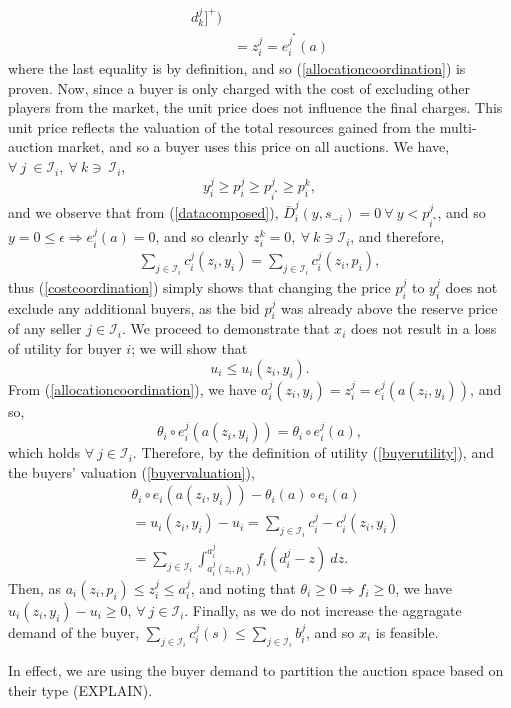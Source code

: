 \documentclass[12pt]{article}
\theoremstyle{definition}
\newcommand{\mcI}{\mathcal{I}}
\begin{document}
\begin{multicols}{2}
\begin{align*}
d_k^{j}\bigg\rbrack^+\bigg) \\
    &= z_i^{j}= e_i^{j^*}(a)
\end{align*}
where the last equality is by definition, and so (\ref{allocationcoordination}) is proven.
Now, since a buyer is only charged with the cost of excluding other players from the market, the
unit price does not influence the final charges. This unit price reflects the
valuation of the total resources gained from the multi-auction market, and so a buyer uses this price on all
auctions.
We have, $\forall \ j\  \in \mcI_i, \ \forall \ k \ni \ \mcI_i$,
$$
    y_i^j \ge p_i^j \ge p_{i^*}^j\ge p_i^k,
$$
and we observe that from (\ref{datacomposed}), $\bar{D}_i^j(y, s_{-i}) =
0 \ \forall \ y < p_{i^*}^j$, and so $y=0 \le \epsilon \Rightarrow e_i^j(a) = 0$,
and so clearly $z_i^k = 0, \ \forall \ k \ni \mcI_i$, and therefore,
\begin{align*}
    \displaystyle\sum_{j\in\mcI_i} c_i^j(z_i,y_i) =\sum_{j\in\mcI_i}
c_i^j(z_i,p_i),
\end{align*}
thus (\ref{costcoordination}) simply shows that changing the price $p^j_i$ to $y^j_i$ does not exclude any
additional buyers, as the bid $p^j_i$ was already above the reserve price of any
seller $j \in \mcI_i$.
We proceed to demonstrate that $x_i$ does not result in a loss of utility for
buyer $i$; we will show that
$$
    u_i \le u_i(z_i,y_i).
$$
From (\ref{allocationcoordination}), we have $a_i^{j}(z_i,y_i) = z_i^{j} = e_i^j(a(z_i,y_i))$, 
and so,
$$
    \theta_i\circ e_i^j(a(z_i,y_i)) = \theta_i\circ e_i^j(a),
$$ 
which holds $\forall \ j\in\mcI_i$.
Therefore, by the definition of utility (\ref{buyerutility}),
and the buyers' valuation (\ref{buyervaluation}), 
\begin{align*}
    &\theta_i\circ e_i(a(z_i,y_i)) - \theta_i(a)\circ e_i(a) \\
    &= u_i(z_i,y_i) - u_i =  \displaystyle\sum_{j\in\mcI_i} c_i^j -c_i^{j}(z_i,y_i)\\
    &= \sum_{j\in\mcI_i}\int_{a_i^j(z_i,p_i)}^{a_i^j} f_i(d_i^j - z) \ dz.
\end{align*}
Then, as $a_i(z_i,p_i) \le z_i^j \le a_i^j $, and noting that
$\theta_i\ge 0\Rightarrow f_i\ge 0$, we have $u_i(z_i,y_i) - u_i \ge 0$, $\forall \ j\in\mcI_i$.
Finally, as we do
not increase the aggragate demand of the buyer, $\sum_{j\in\mcI_i} c_i^j(s) \le 
\sum_{j\in\mcI_i} b_i^j$, and so $x_i$ is feasible.

In effect, we are using the buyer demand
to partition the auction space based on their type (EXPLAIN). \\


\end{multicols}
\end{document}
